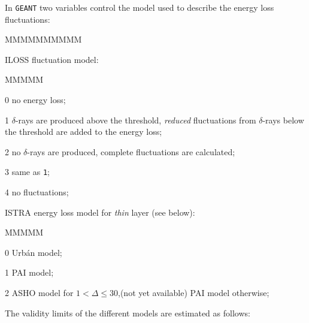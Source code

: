 In {\tt GEANT} two variables control the model used to describe the
energy loss fluctuations: 
\begin{DLtt}{MMMMMMMMMM}
\item[ILOSS] fluctuation model:
\begin{DLtt}{MMMMM}
\item[0] no energy loss;
\item[1] $\delta$-rays are produced above the threshold,
{\it reduced}
fluctuations from $\delta$-rays below the threshold are added to the
energy loss;
\item[2] no $\delta$-rays are produced, complete fluctuations are calculated;
\item[3] same as {\tt 1};
\item[4] no fluctuations;
\end{DLtt}
\item[ISTRA] energy loss model for {\it thin} layer (see below):
\begin{DLtt}{MMMMM}
\item[0] Urb\'{a}n model;
\item[1] PAI model;
\item[2] ASHO model for $1 < \Delta \leq 30$,(not yet available) 
PAI model otherwise;
\end{DLtt}
\end{DLtt}
The validity limits of the different models are estimated
as follows:
